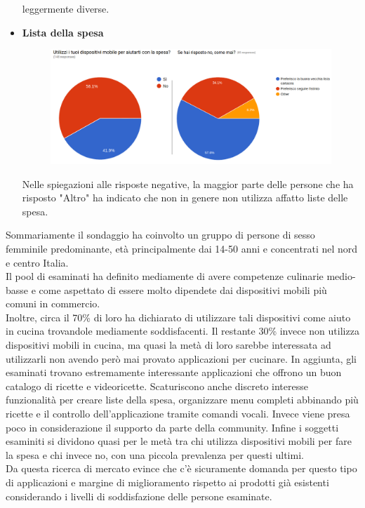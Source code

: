 \begin{itemize}
leggermente diverse.
	\item \textbf{Lista della spesa}
		\begin{figure} [H]
			\centering
			\includegraphics[scale=0.40]{img/survey-1112.png}
		\end{figure}
	Nelle spiegazioni alle risposte negative, la maggior parte delle
persone che ha risposto "Altro" ha indicato che non in genere non
utilizza affatto liste delle spesa.
\end{itemize}

Sommariamente il sondaggio ha coinvolto un gruppo di persone di sesso
femminile predominante, età principalmente dai 14-50 anni e concentrati
nel nord e centro Italia.\\
Il pool di esaminati ha definito mediamente di avere competenze culinarie
medio-basse e come aspettato di essere molto dipendete dai dispositivi
mobili più comuni in commercio. \\

Inoltre, circa il 70\% di loro ha dichiarato di
utilizzare tali dispositivi come aiuto in cucina trovandole mediamente
soddisfacenti. Il restante
30\% invece non utilizza dispositivi mobili in cucina, ma 
quasi la metà di loro sarebbe interessata ad utilizzarli non avendo però
mai provato applicazioni per cucinare.
In aggiunta, gli esaminati trovano estremamente interessante
applicazioni che offrono un buon catalogo di ricette e videoricette.
Scaturiscono anche discreto interesse funzionalità per creare liste
della spesa, organizzare menu completi abbinando più ricette e il
controllo dell'applicazione tramite comandi vocali. Invece viene presa
poco in considerazione il supporto da parte della community.
Infine i soggetti esaminiti si dividono quasi per le metà tra chi
utilizza dispositivi mobili per fare la spesa e chi invece no, con una
piccola prevalenza per questi ultimi.\\

Da questa ricerca di mercato evince che c'è sicuramente domanda per
questo tipo di applicazioni e margine di miglioramento rispetto ai prodotti
già esistenti considerando i livelli di soddisfazione delle persone
esaminate.
